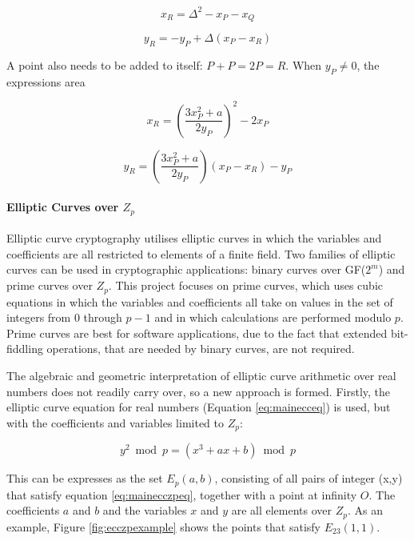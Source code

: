 \documentclass[a4paper,10pt]{report}
\begin{document}
\begin{equation}
  x_{R} = \Delta^{2} - x_{P} - x_{Q} 
  \label{eq:eccbaseadd1}
\end{equation}

\begin{equation}
  y_{R} = -y_{P} + \Delta(x_{P} - x_{R})
  \label{eq:eccbaseadd2}
\end{equation}

A point also needs to be added to itself: $P + P = 2P = R$. When $y_{P} \neq 0$, the expressions area

\begin{equation}
  x_{R} = \left(\frac{3x_{P}^{2} + a}{2y_{P}}\right)^2 - 2x_{P} 
  \label{eq:eccbaseadd3}
\end{equation}

\begin{equation}
  y_{R} = \left(\frac{3x_{P}^{2} + a}{2y_{P}}\right) (x_{P} - x_{R}) - y_{P} 
  \label{eq:eccbaseadd4}
\end{equation}

\paragraph{Elliptic Curves over $Z_{p}$}

Elliptic curve cryptography utilises elliptic curves in which the variables and coefficients are all restricted to elements of a finite field. Two families of elliptic curves can be used in cryptographic applications: binary curves over GF($2^m$) and prime curves over $Z_{p}$. This project focuses on prime curves, which uses cubic equations in which the variables and coefficients all take on values in the set of integers from 0 through $p - 1$ and in which calculations are performed modulo $p$. Prime curves are best for software applications, due to the fact that extended bit-fiddling operations, that are needed by binary curves, are not required. 

The algebraic and geometric interpretation of elliptic curve arithmetic over real numbers does not readily carry over, so a new approach is formed. Firstly, the elliptic curve equation for real numbers (Equation \ref{eq:mainecceq}) is used, but with the coefficients and variables limited to $Z_{p}$:

\begin{equation}
 y^2 \bmod p = (x^3 + ax + b) \bmod p
 \label{eq:mainecczpeq}
\end{equation}

This can be expresses as the set $E_{p}(a,b)$, consisting of all pairs of integer (x,y) that satisfy equation \ref{eq:mainecczpeq}, together with a point at infinity $O$. The coefficients $a$ and $b$ and the variables $x$ and $y$ are all elements over $Z_{p}$. As an example, Figure \ref{fig:ecczpexample} shows the points that satisfy $E_{23}(1,1)$.
\end{document}
